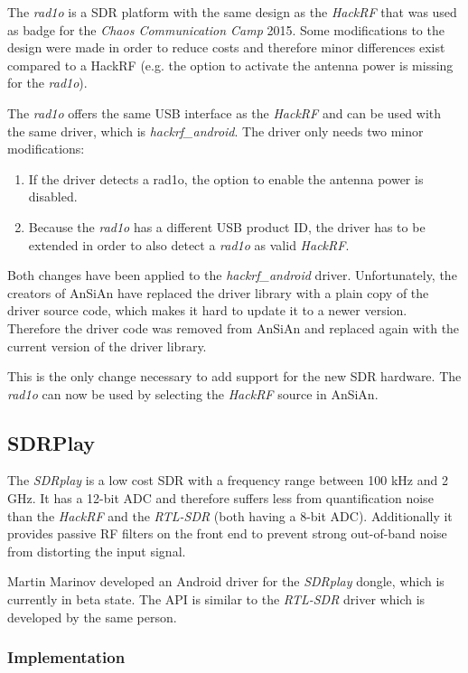 The \emph{rad1o} is a \ac{SDR} platform with the same design as the
\emph{HackRF} that was used as badge for the \emph{Chaos Communication Camp}
2015. Some modifications to the design were made in order to reduce costs and
therefore minor differences exist compared to a HackRF (e.g. the option to
activate the antenna power is missing for the \emph{rad1o}).

The \emph{rad1o} offers the same USB interface as the \emph{HackRF} and can be
used with the same driver, which is \emph{hackrf\_android}. The driver only needs
two minor modifications:
\begin{enumerate}
	\item If the driver detects a rad1o, the option to enable the antenna power
		is disabled.
	\item Because the \emph{rad1o} has a different USB product ID, the driver has
		to be extended in order to also detect a \emph{rad1o} as valid \emph{HackRF}.
\end{enumerate}

Both changes have been applied to the \emph{hackrf\_android} driver. Unfortunately, the
creators of \ac{AnSiAn} have replaced the driver library with a plain copy of the driver
source code, which makes it hard to update it to a newer version. Therefore the
driver code was removed from \ac{AnSiAn} and replaced again with the current version
of the driver library.

This is the only change necessary to add support for the new \ac{SDR} hardware. 
The \emph{rad1o} can now be used by selecting the \emph{HackRF} source in \ac{AnSiAn}.


\subsection{SDRPlay}

The \emph{SDRplay} is a low cost \ac{SDR} with a frequency range between 100 kHz and
2 GHz. It has a 12-bit \ac{ADC} and therefore suffers less from quantification noise
than the \emph{HackRF} and the \emph{RTL-SDR} (both having a 8-bit \ac{ADC}).
Additionally it provides passive \ac{RF} filters on the front end to prevent strong
out-of-band noise from distorting the input signal.

Martin Marinov developed an Android driver for the \emph{SDRplay} dongle, which
is currently in beta state. The API is similar to the \emph{RTL-SDR} driver which is
developed by the same person.

\subsubsection{Implementation}

